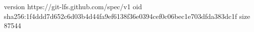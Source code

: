 version https://git-lfs.github.com/spec/v1
oid sha256:1f4ddd7d652c6d03b4d44fa9ef6138f36e0394cef0c06bec1e703dfda383dc1f
size 87544
